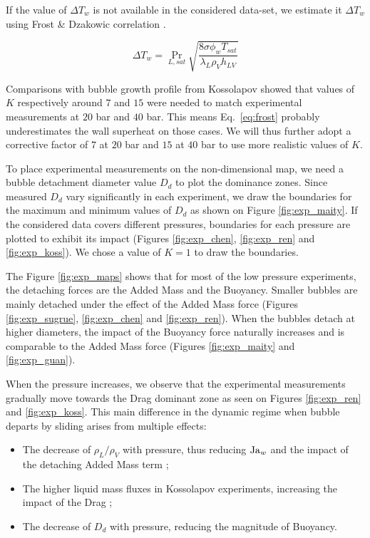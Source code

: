 If the value of $\Delta T_{w}$ is not available in the considered data-set, we estimate it $\Delta T_{w}$ using Frost \& Dzakowic correlation \cite{frost_extension_1967}.

\begin{equation}
\Delta T_{w} = \Pr_{L,sat} \sqrt{\frac{8 \sigma \phi_{w} T_{sat}}{\lambda_{L}\rho_{V}h_{LV}}}
\label{eq:frost}
\end{equation}

Comparisons with bubble growth profile from Kossolapov \cite{kossolapov_experimental_2021} showed that values of $K$ respectively around $7$ and $15$ were needed to match experimental measurements at $20$ bar and $40$ bar. This means Eq.~\ref{eq:frost} probably underestimates the wall superheat on those cases. We will thus further adopt a corrective factor of $7$ at $20$ bar and $15$ at $40$ bar to use more realistic values of $K$.


\npar 

To place experimental measurements on the non-dimensional map, we need a bubble detachment diameter value $D_{d}$ to plot the dominance zones. Since measured $D_{d}$ vary significantly in each experiment, we draw the boundaries for the maximum and minimum values of $D_{d}$ as shown on Figure \ref{fig:exp_maity}. If the considered data covers different pressures, boundaries for each pressure are plotted to exhibit its impact (Figures \ref{fig:exp_chen}, \ref{fig:exp_ren} and \ref{fig:exp_koss}). We chose a value of $K=1$ to draw the boundaries.


The Figure \ref{fig:exp_maps} shows that for most of the low pressure experiments, the detaching forces are the Added Mass and the Buoyancy. Smaller bubbles are mainly detached under the effect of the Added Mass force (Figures \ref{fig:exp_sugrue}, \ref{fig:exp_chen} and \ref{fig:exp_ren}). When the bubbles detach at higher diameters, the impact of the Buoyancy force naturally increases and is comparable to the Added Mass force (Figures \ref{fig:exp_maity} and \ref{fig:exp_guan}).

When the pressure increases, we observe that the experimental measurements gradually move towards the Drag dominant zone as seen on Figures \ref{fig:exp_ren} and \ref{fig:exp_koss}. This main difference in the dynamic regime when bubble departs by sliding arises from multiple effects:

\begin{itemize}
\item The decrease of $\rho_{L}/\rho_{V}$ with pressure, thus reducing $\mathrm{Ja}_{w}$ and the impact of the detaching Added Mass term ;
\item The higher liquid mass fluxes in Kossolapov experiments, increasing the impact of the Drag ;
\item The decrease of $D_{d}$ with pressure, reducing the magnitude of Buoyancy.
\end{itemize}

